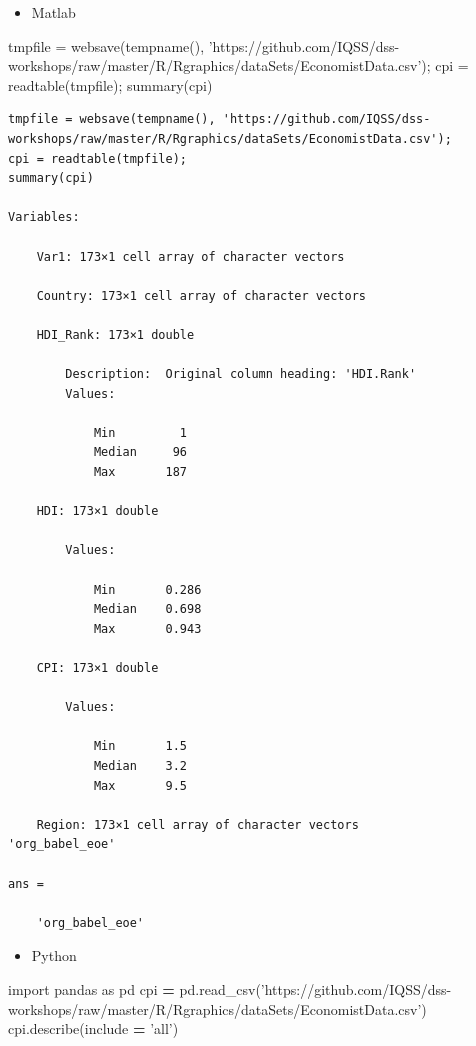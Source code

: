 \documentclass[]{book}
\newenvironment{Shaded}{\begin{snugshade}}{\end{snugshade}}
\newcommand{\ImportTok}[1]{#1}
\newcommand{\NormalTok}[1]{#1}
\newcommand{\OperatorTok}[1]{\textcolor[rgb]{0.81,0.36,0.00}{\textbf{#1}}}
\newcommand{\StringTok}[1]{\textcolor[rgb]{0.31,0.60,0.02}{#1}}
\providecommand{\tightlist}{%
  \setlength{\itemsep}{0pt}\setlength{\parskip}{0pt}}
\begin{document}
\begin{itemize}
\tightlist
\item
  Matlab
\end{itemize}

\begin{Shaded}
\begin{Highlighting}[]
\NormalTok{tmpfile = websave(tempname(), }\StringTok{'https://github.com/IQSS/dss-workshops/raw/master/R/Rgraphics/dataSets/EconomistData.csv'}\NormalTok{);}
\NormalTok{cpi = readtable(tmpfile);}
\NormalTok{summary(cpi)}
\end{Highlighting}
\end{Shaded}

\begin{verbatim}
tmpfile = websave(tempname(), 'https://github.com/IQSS/dss-workshops/raw/master/R/Rgraphics/dataSets/EconomistData.csv');
cpi = readtable(tmpfile);
summary(cpi)

Variables:

    Var1: 173×1 cell array of character vectors

    Country: 173×1 cell array of character vectors

    HDI_Rank: 173×1 double

        Description:  Original column heading: 'HDI.Rank'
        Values:

            Min         1       
            Median     96       
            Max       187       

    HDI: 173×1 double

        Values:

            Min       0.286
            Median    0.698
            Max       0.943

    CPI: 173×1 double

        Values:

            Min       1.5  
            Median    3.2  
            Max       9.5  

    Region: 173×1 cell array of character vectors
'org_babel_eoe'

ans =

    'org_babel_eoe'
\end{verbatim}

\begin{itemize}
\tightlist
\item
  Python
\end{itemize}

\begin{Shaded}
\begin{Highlighting}[]
\ImportTok{import}\NormalTok{ pandas }\ImportTok{as}\NormalTok{ pd}
\NormalTok{cpi }\OperatorTok{=}\NormalTok{ pd.read_csv(}\StringTok{'https://github.com/IQSS/dss-workshops/raw/master/R/Rgraphics/dataSets/EconomistData.csv'}\NormalTok{)}
\NormalTok{cpi.describe(include }\OperatorTok{=} \StringTok{'all'}\NormalTok{)}
\end{Highlighting}
\end{Shaded}
\end{document}
